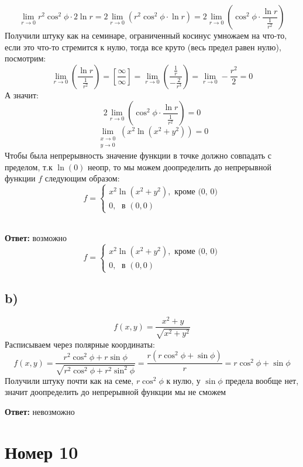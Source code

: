 \documentclass[a4paper,12pt]{article}
\begin{document}
\[
\lim_{r \rightarrow 0} r^2 \cos^2 \phi \cdot2 \ln r = 2 \lim_{r \rightarrow 0} \left( r^2 \cos^2 \phi \cdot \ln r  \right) =  2 \lim_{r \rightarrow 0} \left(\cos^2 \phi \cdot  \frac{ \ln r}{\frac{1}{r^2}} \right)
\]
Получили штуку как на семинаре, ограниченный косинус умножаем на что-то, если это что-то стремится к нулю, тогда все круто (весь предел равен нулю), посмотрим:
\[
\lim_{r \rightarrow 0} \left( \frac{ \ln r}{\frac{1}{r^2}} \right) = \left[\frac{\infty}{\infty}\right] = \lim_{r \rightarrow 0} \left( \frac{ \frac{1}{r} }{-\frac{2}{r^3}} \right) = \lim_{r \rightarrow 0} -\frac{r^2}{2} = 0
\]
А значит:
\[
2 \lim_{r \rightarrow 0} \left(\cos^2 \phi \cdot  \frac{ \ln r}{\frac{1}{r^2}} \right) = 0
\]
\[
\lim_{\begin{matrix} x \rightarrow 0 \\ y \rightarrow 0 \end{matrix}} \left(x^2 \ln (x^2 + y^2) \right) = 0
\]
Чтобы была непрерывность значение функции в точке должно совпадать с пределом, т.к $\ln(0)$ неопр, то мы можем доопределить до непрерывной функции $f$ следующим образом:
\[
f = \begin{cases}
x^2 \ln (x^2 + y^2) , \text{ кроме (0, 0)} \\
0, \; \text{ в } (0, 0)
\end{cases}
\]
\\
{\Large \begin{center}
\textbf{Ответ: } возможно
\[
f = \begin{cases}
x^2 \ln (x^2 + y^2) , \text{ кроме (0, 0)} \\
0, \; \text{ в } (0, 0)
\end{cases}
\]
\end{center}}

\clearpage
 \subsection*{b)}
\[
f(x, y) = \frac{x^2 + y}{\sqrt{x^2 + y^2}}
\]
Расписываем через полярные координаты:
\[
f(x, y) = \frac{r^2 \cos ^2 \phi + r \sin \phi}{\sqrt{r^2\cos^2\phi + r^2 \sin^2 \phi}} = \frac{r(r \cos^2\phi  + \sin \phi)}{r} = r\cos^2 \phi + \sin \phi
\]
Получили штуку почти как на семе,  $r\cos^2 \phi$ к нулю, у $ \sin \phi$ предела вообще нет, значит доопределить до непрерывной функции мы не сможем
{\Large \begin{center}
\textbf{Ответ: } невозможно
\end{center}}
\section*{Номер 10}
\end{document}

